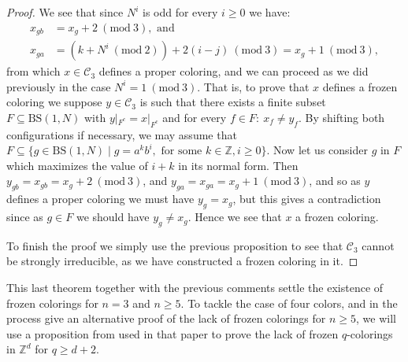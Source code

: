 \documentclass[letterpaper,10pt]{article}
\theoremstyle{plain}
\newcommand{\BS}[1][N]{\mathrm{BS}(1,#1)}
\begin{document}
\begin{proof}
	
	
	We see that since $N^i$ is odd for every $i\ge 0$ we have:
	\begin{align*}
	x_{gb}&=x_g+2\ (\mathrm{mod} \ 3), \text{ and} \\
	x_{ga}&=(k+N^i \ (\mathrm{mod} \ 2)) + 2(i-j) \ (\mathrm{mod} \ 3)=x_g+1 \ (\mathrm{mod} \ 3),
	\end{align*}
	from which $x\in \mathcal{C}_3$ defines a proper coloring, and we can proceed as we did previously in the case $N^i=1\ (\mathrm{mod} \ 3)$. That is, to prove that $x$ defines a frozen coloring we suppose $y\in \mathcal{C}_3$ is such that there exists a finite subset $F\subseteq \BS$ with $y|_{F^ c}=x|_{F^c}$ and for every $f\in F: \ x_f\neq y_f$. By shifting both configurations if necessary, we may assume that $F\subseteq \{g\in \BS\mid g=a^kb^i, \text{ for some }k\in \mathbb{Z}, i\ge 0\}$. Now let us consider $g$ in $F$ which maximizes the value of $i+k$ in its normal form. Then $y_{gb}=x_{gb}=x_g+2\ (\mathrm{mod} \ 3)$, and $y_{ga}=x_{ga}=x_g+1\ (\mathrm{mod} \ 3)$, and so as $y$ defines a proper coloring we must have $y_g=x_g$, but this gives a contradiction since as $g\in F$ we should have $y_g\neq x_g$. Hence we see that $x$ a frozen coloring.
	
	To finish the proof we simply use the previous proposition to see that $\mathcal{C}_3$ cannot be strongly irreducible, as we have constructed a frozen coloring in it.
\end{proof}

This last theorem together with the previous comments settle the existence of frozen colorings for $n=3$ and $n\ge 5$. To tackle the case of four colors, and in the process give an alternative proof of the lack of frozen colorings for $n\ge 5$, we will use a proposition from \cite{alon2019mixing} used in that paper to prove the lack of frozen $q$-colorings in $\mathbb{Z}^d$ for $q\ge d+2$.
\end{document}

